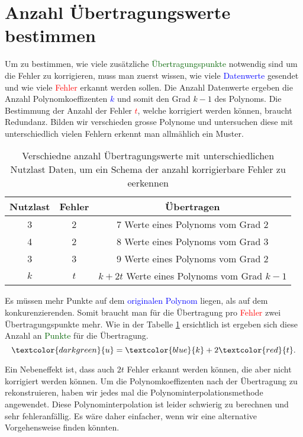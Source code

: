 \section{Anzahl Übertragungswerte bestimmen
\label{reedsolomon:section:Fehlerkorrekturstellen}}
Um zu bestimmen, wie viele zusätzliche \textcolor{darkgreen}{Übertragungspunkte} notwendig sind um die Fehler zu korrigieren,
    muss man zuerst wissen, wie viele \textcolor{blue}{Datenwerte} gesendet und wie viele \textcolor{red}{Fehler} erkannt werden sollen. 
Die Anzahl Datenwerte ergeben die Anzahl Polynomkoeffizenten \textcolor{blue}{$k$} und somit den Grad $k-1$ des Polynoms.
Die Bestimmung der Anzahl der Fehler \textcolor{red}{$t$}, welche korrigiert werden können, braucht Redundanz.
Bilden wir verschieden grosse Polynome und untersuchen diese mit unterschiedlich vielen Fehlern erkennt man allmählich ein Muster.

\begin{table}%
    \centering
    \begin{tabular}{ c c | c} 
        \hline
        Nutzlast & Fehler & Übertragen \\
        \hline 
        3 & 2 & 7 Werte eines Polynoms vom Grad 2 \\ 
        4 & 2 & 8 Werte eines Polynoms vom Grad 3 \\
        3 & 3 & 9 Werte eines Polynoms vom Grad 2 \\ 
        \hline
        $k$ & $t$ & $k+2t$ Werte eines Polynoms vom Grad $k-1$ \\ 
        \hline
    \end{tabular}
    \caption{ Verschiedne anzahl Übertragungswerte mit unterschiedlichen Nutzlast Daten, um ein Schema der anzahl korrigierbare Fehler zu eerkennen}
    \label{tab:fehlerkorrekturstellen}
\end{table}
\par 
Es müssen mehr Punkte auf dem \textcolor{blue}{originalen Polynom} liegen, als auf dem konkurenzierenden.
Somit braucht man für die Übertragung pro \textcolor{red}{Fehler} zwei Übertragungspunkte mehr.
Wie in der Tabelle \ref{tab:fehlerkorrekturstellen} ersichtlich ist ergeben sich diese Anzahl an \textcolor{darkgreen}{Punkte} für die Übertragung.
\begin{equation}
    \textcolor{darkgreen}{u}=
    \textcolor{blue}{k}+2\textcolor{red}{t}.
    \label{reedsolomon:equation2}
\end{equation}

Ein Nebeneffekt ist, dass auch $2t$ Fehler erkannt werden können, die aber nicht korrigiert werden können.
Um die Polynomkoeffizenten nach der Übertragung zu rekonstruieren, haben wir jedes mal die Polynominterpolationsmethode angewendet.
Diese Polynominterpolation ist leider schwierig zu berechnen und sehr fehleranfällig.
Es wäre daher einfacher, wenn wir eine alternative Vorgehensweise finden könnten. 


